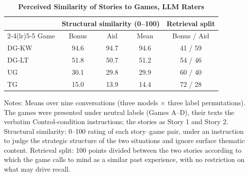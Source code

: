 \begin{table}[!htbp]
\centering
\footnotesize
\renewcommand{\arraystretch}{1.15}
\caption{\textbf{Perceived Similarity of Stories to Games, LLM Raters}}
\label{tab:llm_similarity}
\begin{tabular}{l ccc c}
\toprule
& \multicolumn{3}{c}{Structural similarity (0--100)} & Retrieval split \\
\cmidrule(lr){2-4}\cmidrule(lr){5-5}
Game & Bonus & Aid & Mean & Bonus / Aid \\
\midrule
DG-KW & 94.6 & 94.7 & 94.6 & 41 / 59 \\
DG-LT & 51.8 & 50.7 & 51.2 & 54 / 46 \\
UG    & 30.1 & 29.8 & 29.9 & 60 / 40 \\
TG    & 15.0 & 13.9 & 14.4 & 72 / 28 \\
\bottomrule
\end{tabular}
\begin{flushleft}
\footnotesize Notes: Means over nine conversations (three models $\times$ three label permutations). The games were presented under neutral labels (Games A--D), their texts the verbatim Control-condition instructions; the stories as Story 1 and Story 2. Structural similarity: 0--100 rating of each story--game pair, under an instruction to judge the strategic structure of the two situations and ignore surface thematic content. Retrieval split: 100 points divided between the two stories according to which the game calls to mind as a similar past experience, with no restriction on what may drive recall.
\end{flushleft}
\end{table}
